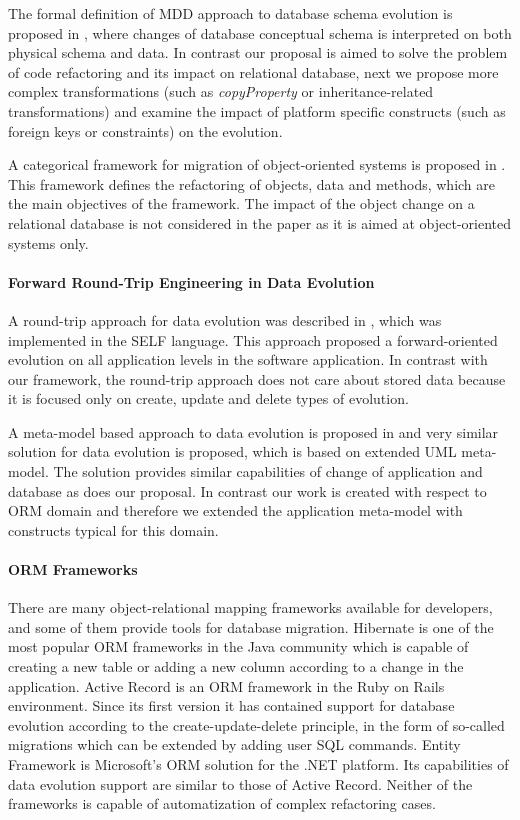 \documentclass[runningheads]{comsis}
\begin{document}
The formal definition of MDD approach to database schema evolution is proposed in \cite{Aboulsamh:FormalModelingEvolution}, where changes of database conceptual schema is interpreted on both physical schema and data. In contrast our proposal is aimed to solve the problem of code refactoring and its impact on relational database, next we propose more complex transformations (such as \emph{copyProperty} or inheritance-related transformations) and examine the impact of platform specific constructs (such as foreign keys or constraints) on the evolution. 

A categorical framework for migration of object-oriented systems is proposed in \cite{Schulz:CategoricalModel}. This framework defines the refactoring of objects, data and methods, which are the main objectives of the framework. The impact of the object change on a relational database is not considered in the paper as it is aimed at object-oriented systems only.

\paragraph{Forward Round-Trip Engineering in Data Evolution} A round-trip approach for data evolution was described in \cite{VanPaesschen:2005to}, which was implemented in the SELF language. This approach proposed a forward-oriented evolution on all application levels in the software application. In contrast with our framework, the round-trip approach does not care about stored data because it is focused only on create, update and delete types of evolution.

A meta-model based approach to data evolution is proposed in \cite{Aboulsamh:MetaModelBasedApproachToIsDataEvolution} and very similar solution for data evolution is proposed, which is based on extended UML meta-model. The solution provides similar capabilities of change of application and database as does our proposal. In contrast our work is created with respect to ORM domain and therefore we extended the application meta-model with constructs typical for this domain.

\paragraph{ORM Frameworks} There are many object-relational mapping frameworks available for developers, and some of them provide tools for database migration. Hibernate \cite{Hibernate} is one of the most popular ORM frameworks in the Java community which is capable of creating a new table or adding a new column according to a change in the application. Active Record \cite{Active_Record} is an ORM framework in the Ruby on Rails environment. Since its first version it has contained support for database evolution according to the create-update-delete principle, in the form of so-called migrations \cite{Rails:Migrations} which can be extended by adding user SQL commands. Entity Framework \cite{Entity_Framework} is Microsoft's ORM solution for the .NET platform. Its capabilities of data evolution support are similar to those of Active Record. Neither of the frameworks is capable of automatization of complex refactoring cases.
\end{document}
